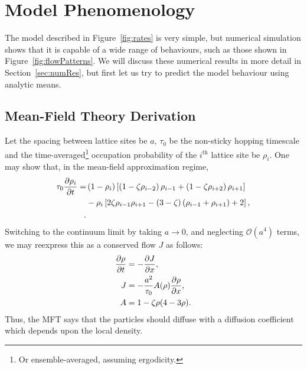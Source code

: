 \section{Model Phenomenology} \label{sec:pheno}
The model described in Figure~\ref{fig:rates} is very simple, but numerical simulation shows that it is capable of a wide range of behaviours, such as those shown in Figure~\ref{fig:flowPatterns}. We will discuss
these numerical results in more detail in Section~\ref{sec:numRes}, but first let us try to predict the model behaviour using analytic means.

\subsection{Mean-Field Theory Derivation}
Let the spacing between lattice sites be $a$, $\tau_0$ be the non-sticky hopping timescale and the time-averaged\footnote{Or ensemble-averaged, assuming ergodicity.} occupation probability of the $i^{\mathrm{th}}$ lattice site be $\rho_i$. 
One may show that, in the mean-field approximation regime,
\begin{align*}
 \tau_0 \frac{\partial \rho_i}{\partial t} = &\left( 1-\rho_i \right) \left[ \left(1-\zeta\rho_{i-2} \right) \rho_{i-1} + \left(1-\zeta\rho_{i+2} \right) \rho_{i+1} \right] \\
 &- \rho_i \left[ 2 \zeta \rho_{i-1} \rho_{i+1}  - (3-\zeta)\left(\rho_{i-1} + \rho_{i+1}\right) + 2 \right],\\.
\end{align*}
Switching to the continuum limit by taking $a\rightarrow 0$, and neglecting $\mathcal{O}(a^4)$ terms, we may reexpress this as a conserved flow $J$ as follows:
\begin{align*}
 \frac{\partial \rho}{\partial t} &= - \frac{\partial J}{\partial x}, \\
 J &= - \frac{a^2}{\tau_0} A(\rho) \frac{\partial \rho}{\partial x}, \\
 A &= 1 - \zeta \rho(4-3\rho). \\
\end{align*}
Thus, the MFT says that the particles should diffuse with a diffusion coefficient which depends upon the local density.
